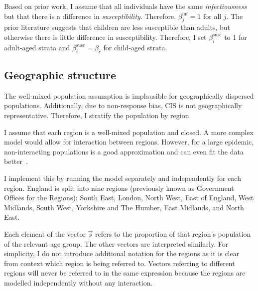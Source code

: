 \documentclass[thesis.tex]{subfiles}
\begin{document}

Based on prior work, I assume that all individuals have the same \emph{infectiousness} but that there is a difference in \emph{susceptibility}.
Therefore, $\beta^\text{inf}_{j} = 1$ for all $j$.
The prior literature suggests that children are less susceptible than adults, but otherwise there is little difference in susceptibility.
Therefore, I set $\beta^\text{susc}_i$ to 1 for adult-aged strata and $\beta^\text{susc}_i = \beta_c$ for child-aged strata.

\subsection{Geographic structure} \label{SEIR:sec:geography}

The well-mixed population assumption is implausible for geographically dispersed populations.
Additionally, due to non-response bias, CIS is not geographically representative.
Therefore, I stratify the population by region.

I assume that each region is a well-mixed population and closed.
A more complex model would allow for interaction between regions.
However, for a large epidemic, non-interacting populations is a good approximation and can even fit the data better~\autocite{birrellRealtimea}.

I implement this by running the model separately and independently for each region.
England is split into nine regions (previously known as Government Offices for the Regions): South East, London, North West, East of England, West Midlands, South West, Yorkshire and The Humber, East Midlands, and North East.

Each element of the vector $\vec{s}$ refers to the proportion of that region's population of the relevant age group.
The other vectors are interpreted similarly.
For simplicity, I do not introduce additional notation for the regions as it is clear from context which region is being referred to.
Vectors referring to different regions will never be referred to in the same expression because the regions are modelled independently without any interaction.
\end{document}

